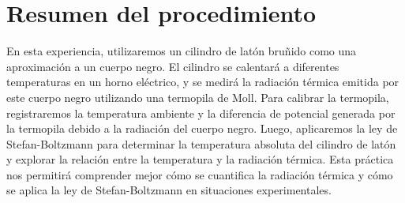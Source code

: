 \documentclass[twocolumn, 12pt]{article}
\begin{document}
\section{Resumen del procedimiento}

En esta experiencia, utilizaremos un cilindro de latón
bruñido como una aproximación a un cuerpo negro. El
cilindro se calentará a diferentes temperaturas en un horno
eléctrico, y se medirá la radiación térmica emitida por
este cuerpo negro utilizando una termopila de Moll. Para
calibrar la termopila, registraremos la temperatura
ambiente y la diferencia de potencial generada por la
termopila debido a la radiación del cuerpo negro. Luego,
aplicaremos la ley de Stefan-Boltzmann para determinar la
temperatura absoluta del cilindro de latón y explorar la
relación entre la temperatura y la radiación térmica. Esta
práctica nos permitirá comprender mejor cómo se cuantifica
la radiación térmica y cómo se aplica la ley de
Stefan-Boltzmann en situaciones experimentales.

\printbibliography
\end{document}
